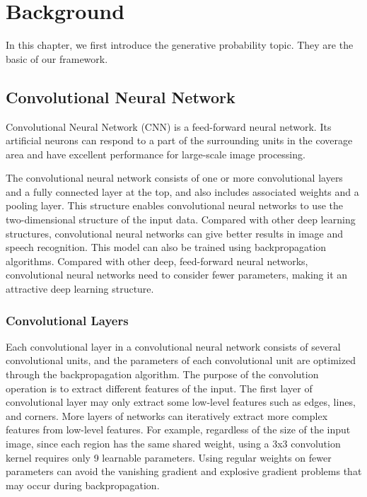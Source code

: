 \chapter{Background}
\label{chap:bg}
In this chapter, we first introduce the generative probability topic.
They are the basic of our framework.

\section{Convolutional Neural Network }

Convolutional Neural Network (CNN) is a feed-forward neural network. Its artificial neurons can respond to a part of the surrounding units in the coverage area and have excellent performance for large-scale image processing.

The convolutional neural network consists of one or more convolutional layers and a fully connected layer at the top, and also includes associated weights and a pooling layer. This structure enables convolutional neural networks to use the two-dimensional structure of the input data. Compared with other deep learning structures, convolutional neural networks can give better results in image and speech recognition. This model can also be trained using backpropagation algorithms. Compared with other deep, feed-forward neural networks, convolutional neural networks need to consider fewer parameters, making it an attractive deep learning structure.

\subsection{Convolutional Layers}
Each convolutional layer in a convolutional neural network consists of several convolutional units, and the parameters of each convolutional unit are optimized through the backpropagation algorithm. The purpose of the convolution operation is to extract different features of the input. The first layer of convolutional layer may only extract some low-level features such as edges, lines, and corners. More layers of networks can iteratively extract more complex features from low-level features. For example, regardless of the size of the input image, since each region has the same shared weight, using a 3x3 convolution kernel requires only 9 learnable parameters. Using regular weights on fewer parameters can avoid the vanishing gradient and explosive gradient problems that may occur during backpropagation.

